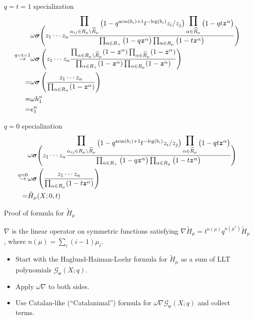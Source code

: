 \documentclass[dvipsnames]{beamer}
\newcommand{\zz}{{\boldsymbol z}}
\newcommand{\sigmabold}{\boldsymbol \sigma}
\newcommand{\Htild}{\tilde{H}}
\newcommand{\Gcal}{{\mathcal G}}
\newcommand{\nubold}{{\boldsymbol \nu }}
\newcommand{\leg}{{\mathrm{leg}}}
\newcommand{\arm}{{\mathrm{arm}}}
\theoremstyle{definition}
\begin{document}
\begin{frame}{\(q=t=1\) specialization}
  \begin{align*}
          & \omega \sigmabold \Bigg( z_1 \cdots z_n
\frac{
\displaystyle\prod_{\alpha_{ij} \in R_\mu \setminus \widehat{R}_\mu }
 \raisebox{-1.4mm}{$\big(1- q^{\arm(b_i)+1} t^{-\leg(b_i)} z_i/z_j \big)$}
\displaystyle\prod_{\alpha \in \widehat{R}_{\mu}}
 \raisebox{-1.4mm}{$\big(1-q  t\zz^\alpha \big)$} } {\prod_{\alpha \in R_+} \big(1-q  \zz^\alpha\big)
\prod_{\alpha \in R_\mu} \big(1-t  \zz^\alpha\big)} 
           \Bigg) \\
    \overset{q=t=1}{\to} & \omega \sigmabold \left( z_1\cdots z_n
    \frac{\prod_{\alpha \in R_\mu \setminus \widehat{R}_\mu}
    (1-\zz^\alpha) \prod_{\alpha \in \widehat{R}_\mu}(1-\zz^\alpha)}{\prod_{\alpha \in R_+}
    (1-\zz^\alpha) \prod_{\alpha \in R_\mu} (1-\zz^\alpha)}\right) \\
    = & \omega \sigmabold\left(\frac{z_1 \cdots z_n}{\prod_{\alpha \in R_+}
      (1-\zz^\alpha)}\right) \\
    = & \omega h_1^n \\
    = & e_1^n
  \end{align*}
\end{frame}
\begin{frame}{\(q=0\) specialization}
  \begin{align*}
          & \omega \sigmabold \Bigg( z_1 \cdots z_n
\frac{
\displaystyle\prod_{\alpha_{ij} \in R_\mu \setminus \widehat{R}_\mu }
 \raisebox{-1.4mm}{$\big(1- q^{\arm(b_i)+1} t^{-\leg(b_i)} z_i/z_j \big)$}
\displaystyle\prod_{\alpha \in \widehat{R}_{\mu}}
 \raisebox{-1.4mm}{$\big(1-q  t\zz^\alpha \big)$} } {\prod_{\alpha \in R_+} \big(1-q  \zz^\alpha\big)
\prod_{\alpha \in R_\mu} \big(1-t  \zz^\alpha\big)} 
           \Bigg) \\
    \overset{q=0}{\to} & \omega \sigmabold \left( \frac{z_1\cdots z_n}{\prod_{\alpha \in
                         R_\mu} (1-t \zz^\alpha)}  \right) \\
     = & \Htild_\mu(X;0,t)
  \end{align*}
\end{frame}
\begin{frame}{Proof of formula for \(\Htild_\mu\)}
  \begin{definition}
    $\nabla$ is the linear operator on symmetric functions satisfying
    $\nabla \Htild _{\mu } = t^{n(\mu)}q^{n(\mu ^{*})} \Htild _{\mu
    }$, where $n(\mu ) = \sum _{i} (i-1)\mu_{i}.$
  \end{definition}\pause
\begin{itemize}
\item Start with the Haglund-Haiman-Loehr formula for  $\Htild_\mu$ as a sum of LLT polynomials  $\Gcal_\nubold(X;q)$.\pause
\item Apply  $\omega\nabla$ to both sides.\pause
\item Use Catalan-like (``Catalanimal'') formula for  $\omega\nabla \Gcal_\nubold(X;q)$
  and collect terms.
\end{itemize}
\end{frame}
\end{document}
